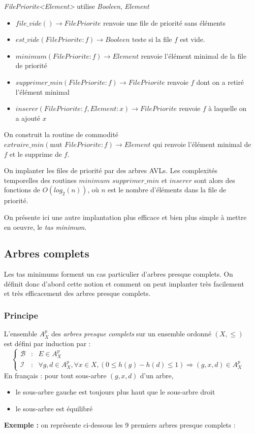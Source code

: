 \documentclass[../../../main.tex]{subfiles}
\begin{document}
\textit{FilePriorite\textless{}Element\textgreater} utilise \textit{Booleen}, \textit{Element}
\begin{itemize}
	\item $file\_vide()\rightarrow FilePriorite$ renvoie une file de priorité sans éléments
	\item $est\_vide(FilePriorite:f)\rightarrow Booleen$ teste si la file $f$ est vide.
	\item $minimum(FilePriorite:f)\rightarrow Element$ renvoie l'élément minimal de la file de priorité
	\item $supprimer\_min(FilePriorite:f)\rightarrow FilePriorite$ renvoie $f$ dont on a retiré l'élément minimal
	\item $inserer(FilePriorite:f, Element:x)\rightarrow FilePriorite$ renvoie $f$ à laquelle on a ajouté $x$
\end{itemize}
On construit la routine de commodité $extraire\_min(\text{mut }FilePriorite:f)\rightarrow Element$ qui renvoie l'élément minimal de $f$ et le supprime de $f$.

On implanter les files de priorité par des arbres AVLs. Les complexités temporelles des routines $minimum$ $supprimer\_min$ et $inserer$ sont alors des fonctions de $O(log_2(n))$, où $n$ est le nombre d'éléments dans la file de priorité.

On présente ici une autre implantation plus efficace et bien plus simple à mettre en oeuvre, le \textit{tas minimum}.
\subsection{Arbres complets}
Les tas minimums forment un cas particulier d'arbres presque complets. On définit donc d'abord cette notion et comment on peut implanter très facilement et très efficacement des arbres presque complets.
\subsubsection{Principe}
 {
	L'ensemble $A^p_X$ des \textit{arbres presque complets} sur un ensemble ordonné $(X, \leq)$ est défini par induction par :
	$$\left\{\begin{array}{cll}
	\mathcal{B} & : & E\in A^p_X \\
	\mathcal{I} & : & \forall g, d\in A^p_X, \forall x\in X, (0 \leq h(g) - h(d) \leq 1) \Rightarrow (g, x, d)\in A^p_X
\end{array}\right.$$
	En français : pour tout sous-arbre $(g, x, d)$ d'un arbre,
	\begin{itemize}
		\item le sous-arbre gauche est toujours plus haut que le sous-arbre droit
		\item le sous-arbre est équilibré
	\end{itemize}
}
\textbf{Exemple :} on représente ci-dessous les 9 premiers arbres presque complets :
\end{document}
